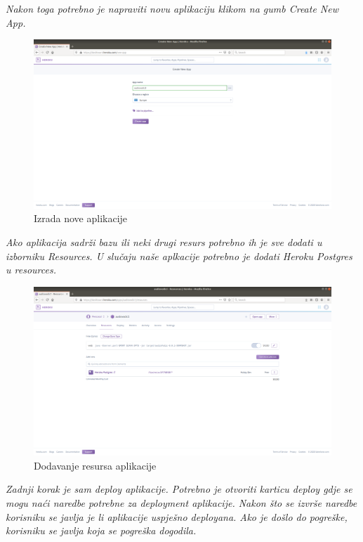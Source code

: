 			\newpage
			\textit{Nakon toga potrebno je napraviti novu aplikaciju klikom na gumb Create New App.}
			
			\begin{figure}[H]
				\includegraphics[scale=0.25]{slike/newHeroku.png}
				\centering
				\caption{Izrada nove aplikacije}
				\label{fig:promjene}
			\end{figure}
		
			\newpage
			\textit{Ako aplikacija sadrži bazu ili neki drugi resurs potrebno ih je sve dodati u izborniku Resources. U slučaju naše aplkacije potrebno je dodati Heroku Postgres u resources.}
			
			\begin{figure}[H]
				\includegraphics[scale=0.25]{slike/resHeroku.png}
				\centering
				\caption{Dodavanje resursa aplikacije}
				\label{fig:promjene}
			\end{figure}
		
			\newpage
			\textit{Zadnji korak je sam deploy aplikacije. Potrebno je otvoriti karticu deploy gdje se mogu naći naredbe potrebne za deployment aplikacije. Nakon što se izvrše naredbe korisniku se javlja je li aplikacije uspješno deployana. Ako je došlo do pogreške, korisniku se javlja koja se pogreška dogodila.}
			
